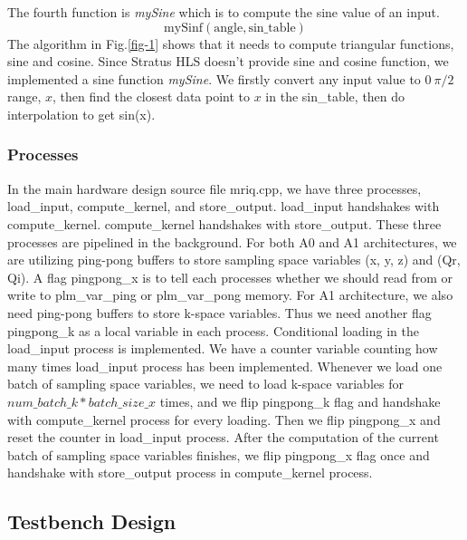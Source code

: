 The fourth function is \textit{mySine} which is to compute the sine value of an
input.
%
$$\mathrm{mySinf(angle, sin\_table)}$$
%
The algorithm in Fig.\ref{fig-1} shows
that it needs to compute triangular functions, sine and cosine. Since Stratus
HLS doesn't provide sine and cosine function, we implemented a sine function
\textit{mySine}. We firstly convert any input value to $0~\pi/2$ range, $x$,
then find the closest data point to $x$ in the sin\_table, then do interpolation
to get sin(x).  \\

\subsubsection{Processes}

In the main hardware design source file mriq.cpp, we have three processes,
load\_input, compute\_kernel, and store\_output. load\_input handshakes with
compute\_kernel. compute\_kernel handshakes with store\_output. These three
processes are pipelined in the background. For both A0 and A1 architectures, we
are utilizing ping-pong buffers to store sampling space variables (x, y, z) and
(Qr, Qi). A flag pingpong\_x is to tell each processes whether we should read
from or write to plm\_var\_ping or plm\_var\_pong memory. For A1 architecture,
we also need ping-pong buffers to store k-space variables. Thus we need another
flag pingpong\_k as a local variable in each process. Conditional loading in the
load\_input process is implemented. We have a counter variable counting how many
times load\_input process has been implemented. Whenever we load one batch of
sampling space variables, we need to load k-space variables for $num\_batch\_k *
batch\_size\_x$ times, and we flip pingpong\_k flag and handshake with
compute\_kernel process for every loading. Then we flip pingpong\_x and reset
the counter in load\_input process. After the computation of the current batch
of sampling space variables finishes, we flip pingpong\_x flag once and
handshake with store\_output process in compute\_kernel process. \\

\subsection{Testbench Design}

